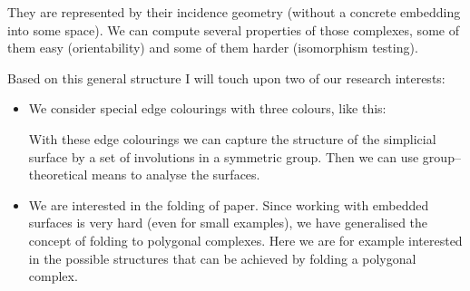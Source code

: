 \documentclass{scrartcl}
\begin{document}
\begin{center}
        \end{center} 

    They are represented by their incidence geometry (without a concrete
    embedding into some space).
    We can compute several properties of those
    complexes, some of them easy (orientability) and some of them harder
    (isomorphism testing).

    Based on this general structure I will touch upon two of our research
    interests:
    \begin{itemize}
        \item We consider special edge colourings with three colours, like
            this:
            \begin{center}
            \end{center}
            With these edge colourings we can capture the structure of
            the simplicial surface by a set of involutions in a symmetric
            group. Then we can use group--theoretical means to analyse the
            surfaces.
        \item We are interested in the folding of paper. Since working with
            embedded surfaces is very hard (even for small examples), we have
            generalised the concept of folding to polygonal complexes. Here we
            are for example interested in the possible structures that can be
            achieved by folding a polygonal complex.
    \end{itemize}
\end{document}
